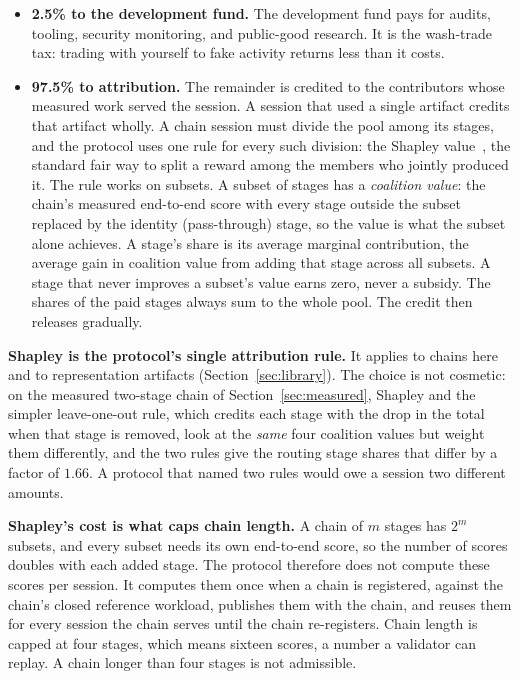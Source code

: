 \documentclass[11pt]{article}
\begin{document}
\begin{itemize}
    \item \textbf{2.5\% to the development fund.} The development
          fund pays for audits, tooling, security monitoring, and
          public-good research. It is the wash-trade tax: trading with
          yourself to fake activity returns less than it costs.
    \item \textbf{97.5\% to attribution.} The remainder is credited
          to the contributors whose measured work served the session. A
          session that used a single artifact credits that artifact
          wholly. A chain session must divide the pool among its stages,
          and the protocol uses one rule for every such division: the
          Shapley value~\cite{shapley1953}, the standard fair way to
          split a reward among the members who jointly produced it. The
          rule works on subsets. A subset of stages has a
          \emph{coalition value}: the chain's measured end-to-end score
          with every stage outside the subset replaced by the identity
          (pass-through) stage, so the value is what the subset alone
          achieves. A stage's share is its average marginal
          contribution, the average gain in coalition value from adding
          that stage across all subsets. A stage that never improves a
          subset's value earns zero, never a subsidy. The shares of the
          paid stages always sum to the whole pool. The credit then
          releases gradually.
\end{itemize}

\textbf{Shapley is the protocol's single attribution rule.} It
applies to chains here and to representation artifacts
(Section~\ref{sec:library}). The choice is not cosmetic: on the
measured two-stage chain of Section~\ref{sec:measured}, Shapley
and the simpler leave-one-out rule, which credits each stage with
the drop in the total when that stage is removed, look at the
\emph{same} four coalition values but weight them differently,
and the two rules
give the routing stage shares that differ by a factor of $1.66$.
A protocol that named two rules would owe a session two different
amounts.

\textbf{Shapley's cost is what caps chain length.} A chain of $m$
stages has $2^m$ subsets, and every subset needs its own end-to-end
score, so the number of scores doubles with each added stage. The
protocol therefore does not compute these scores per session. It
computes them once when a chain is registered, against the chain's
closed reference workload, publishes them with the chain, and
reuses them for every session the chain serves until the chain
re-registers. Chain length is capped at four stages, which means
sixteen scores, a number a validator can replay. A chain longer
than four stages is not admissible.
\end{document}
